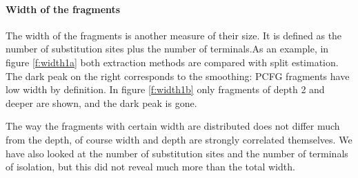 \paragraph{Width of the fragments}

The width of the fragments is another measure of their size. It is defined as the number of substitution sites plus the number of terminals.As an example, in figure \ref{f:width1a} both extraction methods are compared with split estimation.  The dark peak on the right corresponds to the smoothing: PCFG fragments have low width by definition. In figure \ref{f:width1b} only fragments of depth 2 and deeper are shown, and the dark peak is gone.

The way the fragments with certain width are distributed does not differ much from the depth, of course width and depth are strongly correlated themselves. We have also looked at the number of substitution sites and the number of terminals of isolation, but this did not reveal much more than the total width. 



